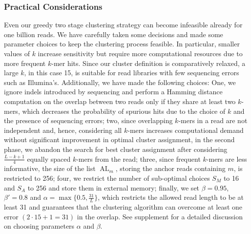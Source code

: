 \documentclass[a4paper]{article}
\DeclareMathOperator{\AL}{AL}
\begin{document}
\subsubsection{Practical Considerations}
Even our greedy two stage
clustering strategy can become infeasible already for one billion
reads. We have carefully taken some decisions and made some parameter choices
to keep the clustering process feasible. In particular, smaller values of
$k$ increase sensitivity but require more
computational resources due to more frequent $k$-mer hits.
Since our cluster definition is comparatively
relaxed, a large $k$, in this case 15,
is suitable for read libraries with few sequencing errors such as
Illumina's.
Additionally, we have made the following choices:
One, we ignore indels introduced by sequencing and perform a Hamming distance computation on the overlap between two reads
only if they share at least two $k$-mers,
which decreases the probability of spurious hits due to the choice of $k$
and the presence of sequencing errors;
two, since overlapping $k$-mers in a read are not independent and,
hence, considering all $k$-mers increases computational demand without significant
improvement in optimal cluster assignment,
in the second phase, we abandon the search for best cluster assignment
after considering $\frac{L-k+1}{4}$ equally spaced $k$-mers from the read;
three, since frequent $k$-mers are less informative, the size of the list
$\AL_m$, storing the anchor reads containing $m$, is restricted to 256;
four, we restrict the number of sub-optimal choices $S_M$ to 16 and
$S_A$ to 256
and store them in external memory;
finally, we set $\beta=0.95$, $\beta'=0.8$ and
$\alpha=\max\{0.5, \frac{31}{L}\}$,
which restricts the allowed read length to be at least 31 and guarantees
that the clustering algorithm can overcome at least one error
$(2\cdot15+1=31)$ in the overlap. See supplement
for a detailed discussion on choosing parameters $\alpha$ and $\beta$.
\end{document}

